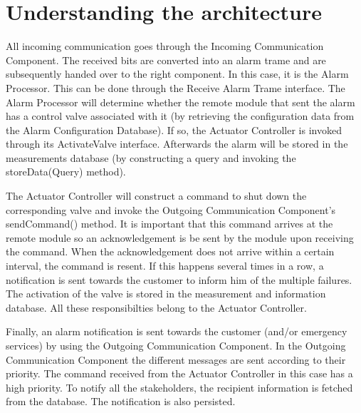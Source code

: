 \chapter{Understanding the architecture}
\label{chap:understanding-architecture}

\npar All incoming communication goes through the Incoming Communication
Component. The received bits are converted into an alarm trame and are
subsequently handed over to the right component. In this case, it is the Alarm
Processor. This can be done through the Receive Alarm Trame interface. The Alarm
Processor will determine whether the remote module that sent the alarm has a
control valve associated with it (by retrieving the configuration data from the
Alarm Configuration Database). If so, the Actuator Controller is invoked through
its ActivateValve interface. Afterwards the alarm will be stored in the
measurements database (by constructing a query and invoking the storeData(Query)
method).

\npar The Actuator Controller will construct a command to shut down the
corresponding valve and invoke the Outgoing Communication Component’s
sendCommand() method. It is important that this command arrives at the remote
module so an acknowledgement is be sent by the module upon receiving the
command. When the acknowledgement does not arrive within a certain interval, the
command is resent. If this happens several times in a row, a notification is
sent towards the customer to inform him of the multiple failures. The activation
of the valve is stored in the measurement and information database. All these
responsibilties belong to the Actuator Controller.

\npar Finally, an alarm notification is sent towards the customer (and/or
emergency services) by using the Outgoing Communication Component. In the
Outgoing Communication Component the different messages are sent according to
their priority. The command received from the Actuator Controller in this
case has a high priority. To notify all the stakeholders, the recipient
information is fetched from the database. The notification is also persisted.
